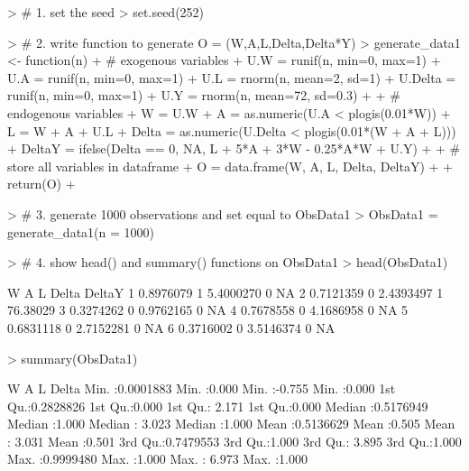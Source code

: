 \documentclass[answers]{exam}
\begin{document}
\begin{solution}


\begin{Schunk}
\begin{Sinput}
> # 1. set the seed
> set.seed(252)
\end{Sinput}
\end{Schunk}

\begin{Schunk}
\begin{Sinput}
> # 2. write function to generate O = (W,A,L,Delta,Delta*Y)
> generate_data1 <- function(n){
+   # exogenous variables
+   U.W = runif(n, min=0, max=1)
+   U.A = runif(n, min=0, max=1)
+   U.L = rnorm(n, mean=2, sd=1)
+   U.Delta = runif(n, min=0, max=1)
+   U.Y = rnorm(n, mean=72, sd=0.3)
+   
+   # endogenous variables
+   W = U.W
+   A = as.numeric(U.A < plogis(0.01*W))
+   L = W + A + U.L
+   Delta = as.numeric(U.Delta < plogis(0.01*(W + A + L)))
+   DeltaY = ifelse(Delta == 0, NA, L + 5*A + 3*W - 0.25*A*W + U.Y)
+   
+   # store all variables in dataframe
+   O = data.frame(W, A, L, Delta, DeltaY)
+   
+   return(O)
+ }
\end{Sinput}
\end{Schunk}

\begin{Schunk}
\begin{Sinput}
> # 3. generate 1000 observations and set equal to ObsData1
> ObsData1 = generate_data1(n = 1000)
\end{Sinput}
\end{Schunk}

\begin{Schunk}
\begin{Sinput}
> # 4. show head() and summary() functions on ObsData1
> head(ObsData1)
\end{Sinput}
\begin{Soutput}
          W A         L Delta   DeltaY
1 0.8976079 1 5.4000270     0       NA
2 0.7121359 0 2.4393497     1 76.38029
3 0.3274262 0 0.9762165     0       NA
4 0.7678558 0 4.1686958     0       NA
5 0.6831118 0 2.7152281     0       NA
6 0.3716002 0 3.5146374     0       NA
\end{Soutput}
\begin{Sinput}
> summary(ObsData1)
\end{Sinput}
\begin{Soutput}
       W                   A               L              Delta      
 Min.   :0.0001883   Min.   :0.000   Min.   :-0.755   Min.   :0.000  
 1st Qu.:0.2828826   1st Qu.:0.000   1st Qu.: 2.171   1st Qu.:0.000  
 Median :0.5176949   Median :1.000   Median : 3.023   Median :1.000  
 Mean   :0.5136629   Mean   :0.505   Mean   : 3.031   Mean   :0.501  
 3rd Qu.:0.7479553   3rd Qu.:1.000   3rd Qu.: 3.895   3rd Qu.:1.000  
 Max.   :0.9999480   Max.   :1.000   Max.   : 6.973   Max.   :1.000  
                                                                     

\end{Soutput}
\end{Schunk}
\end{solution}
\end{document}
